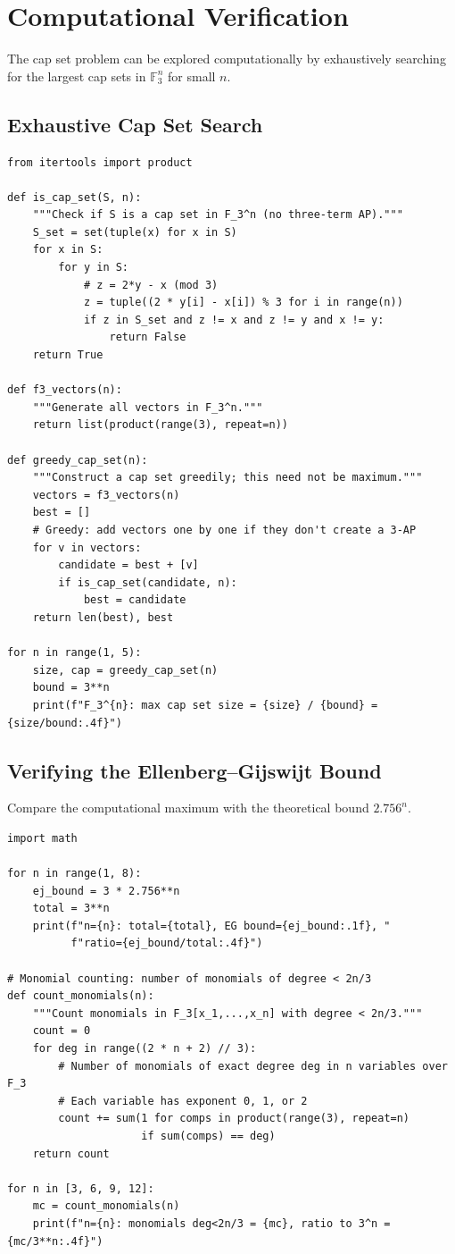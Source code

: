 \section{Computational Verification}

The cap set problem can be explored computationally by exhaustively searching for the largest cap sets in $\mathbb{F}_3^n$ for small $n$.

\subsection{Exhaustive Cap Set Search}

\begin{verbatim}
from itertools import product

def is_cap_set(S, n):
    """Check if S is a cap set in F_3^n (no three-term AP)."""
    S_set = set(tuple(x) for x in S)
    for x in S:
        for y in S:
            # z = 2*y - x (mod 3)
            z = tuple((2 * y[i] - x[i]) % 3 for i in range(n))
            if z in S_set and z != x and z != y and x != y:
                return False
    return True

def f3_vectors(n):
    """Generate all vectors in F_3^n."""
    return list(product(range(3), repeat=n))

def greedy_cap_set(n):
    """Construct a cap set greedily; this need not be maximum."""
    vectors = f3_vectors(n)
    best = []
    # Greedy: add vectors one by one if they don't create a 3-AP
    for v in vectors:
        candidate = best + [v]
        if is_cap_set(candidate, n):
            best = candidate
    return len(best), best

for n in range(1, 5):
    size, cap = greedy_cap_set(n)
    bound = 3**n
    print(f"F_3^{n}: max cap set size = {size} / {bound} = {size/bound:.4f}")
\end{verbatim}

\subsection{Verifying the Ellenberg--Gijswijt Bound}

Compare the computational maximum with the theoretical bound $2.756^n$.

\begin{verbatim}
import math

for n in range(1, 8):
    ej_bound = 3 * 2.756**n
    total = 3**n
    print(f"n={n}: total={total}, EG bound={ej_bound:.1f}, "
          f"ratio={ej_bound/total:.4f}")

# Monomial counting: number of monomials of degree < 2n/3
def count_monomials(n):
    """Count monomials in F_3[x_1,...,x_n] with degree < 2n/3."""
    count = 0
    for deg in range((2 * n + 2) // 3):
        # Number of monomials of exact degree deg in n variables over F_3
        # Each variable has exponent 0, 1, or 2
        count += sum(1 for comps in product(range(3), repeat=n)
                     if sum(comps) == deg)
    return count

for n in [3, 6, 9, 12]:
    mc = count_monomials(n)
    print(f"n={n}: monomials deg<2n/3 = {mc}, ratio to 3^n = {mc/3**n:.4f}")
\end{verbatim}

